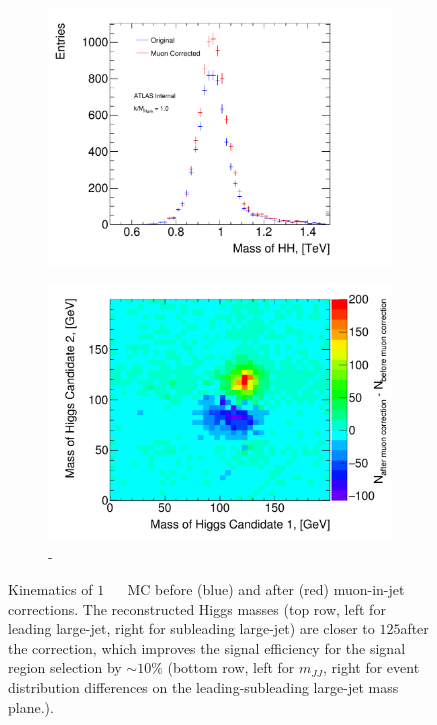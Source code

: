 \begin{figure}
\begin{center}
    \captionsetup{justification=centering}
    \begin{subfigure}[b]{0.45\textwidth}
        \includegraphics[width=\textwidth]{figures/boosted/muons/hh_mass_dbl.pdf}
        \caption{\mtwoJ}
        \label{fig:boosted-muons-signal-mjj}
    \end{subfigure}
    \quad
    \begin{subfigure}[b]{0.45\textwidth}
        \includegraphics[width=\textwidth]{figures/boosted/muons/h12_corr_mass.pdf}
        \caption{\mleadJ-\msublJ}
        \label{fig:boosted-muons-signal-mj2d}
    \end{subfigure}
  \caption{Kinematics of $1$\TeV~ \Grav~ MC before (blue) and after (red) muon-in-jet corrections. The reconstructed Higgs masses (top row, left for leading large-\R jet, right for subleading large-\R jet) are closer to $125$\GeV after the correction, which improves the signal efficiency for the signal region selection by $\sim\!10\%$ (bottom row, left for $m_{JJ}$, right for event distribution differences on the leading-subleading large-\R jet mass plane.).}
  \label{fig:boosted-muons-signal}
\end{center}
\end{figure}

